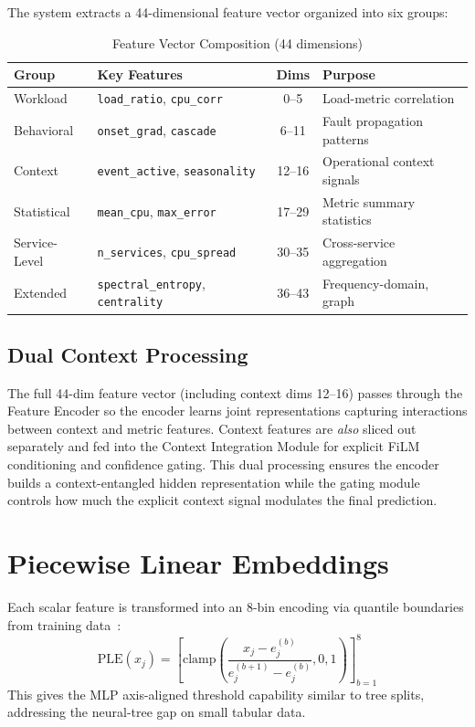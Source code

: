 \documentclass[12pt,a4paper]{report}
\begin{document}
The system extracts a 44-dimensional feature vector organized into six groups:

\begin{table}[h]
    \centering
    \caption{Feature Vector Composition (44 dimensions)}
    \label{tab:features}
    \begin{tabular}{llcl}
        \toprule
        \textbf{Group} & \textbf{Key Features} & \textbf{Dims} & \textbf{Purpose} \\
        \midrule
        Workload & \texttt{load\_ratio}, \texttt{cpu\_corr} & 0--5 & Load-metric correlation \\
        Behavioral & \texttt{onset\_grad}, \texttt{cascade} & 6--11 & Fault propagation patterns \\
        Context & \texttt{event\_active}, \texttt{seasonality} & 12--16 & Operational context signals \\
        Statistical & \texttt{mean\_cpu}, \texttt{max\_error} & 17--29 & Metric summary statistics \\
        Service-Level & \texttt{n\_services}, \texttt{cpu\_spread} & 30--35 & Cross-service aggregation \\
        Extended & \texttt{spectral\_entropy}, \texttt{centrality} & 36--43 & Frequency-domain, graph \\
        \bottomrule
    \end{tabular}
\end{table}

\subsection{Dual Context Processing}

The full 44-dim feature vector (including context dims 12--16) passes through the Feature Encoder so the encoder learns joint representations capturing interactions between context and metric features. Context features are \textit{also} sliced out separately and fed into the Context Integration Module for explicit FiLM conditioning and confidence gating. This dual processing ensures the encoder builds a context-entangled hidden representation while the gating module controls how much the explicit context signal modulates the final prediction.

\section{Piecewise Linear Embeddings}

Each scalar feature is transformed into an 8-bin encoding via quantile boundaries from training data~\cite{gorishniy2022embeddings}:
\begin{equation}
    \text{PLE}(x_j) = \left[\text{clamp}\left(\frac{x_j - e_j^{(b)}}{e_j^{(b+1)} - e_j^{(b)}}, 0, 1\right)\right]_{b=1}^{8}
\end{equation}
This gives the MLP axis-aligned threshold capability similar to tree splits, addressing the neural-tree gap on small tabular data.
\end{document}
